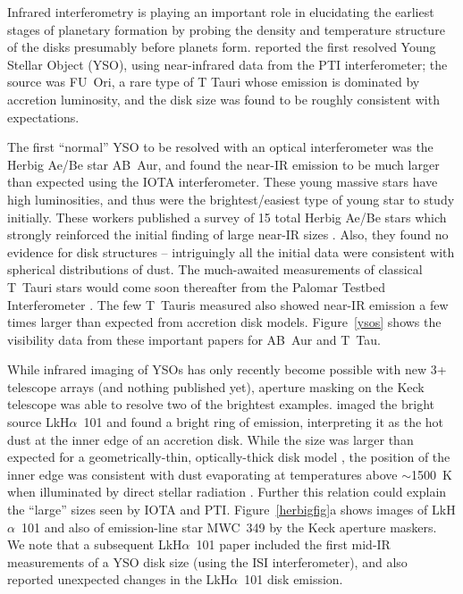\documentclass[12pt]{article}
\begin{document}
Infrared interferometry is playing an important role in elucidating
the earliest stages of planetary formation by probing the density and
temperature structure of the disks presumably before planets form.
\citet{malbet1998} reported the first resolved Young Stellar Object
(YSO), using near-infrared data from the PTI interferometer; the
source was FU~Ori, a rare type of T Tauri whose emission is dominated
by accretion luminosity, and the disk size was found to be roughly
consistent with expectations.

The first ``normal'' YSO to be resolved with an optical interferometer
was the Herbig Ae/Be star AB~Aur, and \citet{rmg1999a} found the
near-IR emission to be much larger than expected using the IOTA
interferometer.  These young massive stars have high luminosities, and
thus were the brightest/easiest type of young star to study initially.
These workers published a survey of 15 total Herbig Ae/Be stars which
strongly reinforced the initial finding of large near-IR sizes
\citep{millangabetthesis,millangabet2001}. Also, they found no
evidence for disk structures -- intriguingly all the initial data were
consistent with spherical distributions of dust.  The much-awaited
measurements of classical T~Tauri stars would come soon thereafter
from the Palomar Testbed Interferometer \citep{akeson2000,akeson2002}.
The few T~Tauris measured also showed near-IR emission a few times
larger than expected from accretion disk models. Figure~\ref{ysos}
shows the visibility data from these important papers for AB~Aur and
T~Tau.  

While infrared imaging of YSOs has only recently become possible with
new 3+ telescope arrays (and nothing published yet), aperture masking
on the Keck telescope was able to resolve two of the brightest
examples.  \citet{tuthill2001a,tuthill2002} imaged the bright source
LkH$\alpha$~101 and found a bright ring of emission, interpreting it
as the hot dust at the inner edge of an accretion disk.  While the
size was larger than expected for a geometrically-thin,
optically-thick disk model \citep[e.g.,][]{hillenbrand1992}, the
position of the inner edge was consistent with dust evaporating at
temperatures above $\sim$1500~K when illuminated by direct stellar
radiation \citep[the standard paradigm for dust shells around evolved
stars; see][]{rrh1982,dyck1984}.  Further this relation could explain
the ``large'' sizes seen by IOTA and PTI.
Figure~\ref{herbigfig}a
shows images of LkH$\alpha$~101 and also of emission-line star MWC~349
by the Keck aperture maskers.  We note that a subsequent
LkH$\alpha$~101 paper \citep{tuthill2002} included the first mid-IR
measurements of a YSO disk size (using the ISI interferometer), and
also reported unexpected changes in the LkH$\alpha$~101 disk emission.
\end{document}
